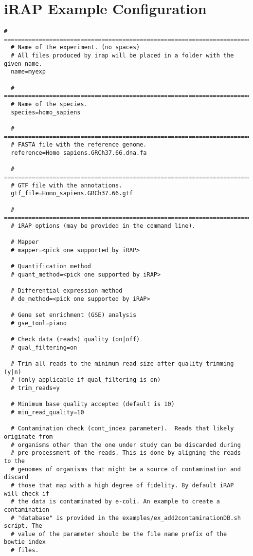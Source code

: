 \chapter{iRAP Example Configuration}

\begin{lstlisting}[numbers=none, breaklines=true]
  # =============================================================================
  # Name of the experiment. (no spaces)
  # All files produced by irap will be placed in a folder with the given name.
  name=myexp

  # =============================================================================
  # Name of the species.
  species=homo_sapiens

  # =============================================================================
  # FASTA file with the reference genome.
  reference=Homo_sapiens.GRCh37.66.dna.fa

  # =============================================================================
  # GTF file with the annotations.
  gtf_file=Homo_sapiens.GRCh37.66.gtf

  # =============================================================================
  # iRAP options (may be provided in the command line).

  # Mapper
  # mapper=<pick one supported by iRAP>

  # Quantification method
  # quant_method=<pick one supported by iRAP>

  # Differential expression method
  # de_method=<pick one supported by iRAP>

  # Gene set enrichment (GSE) analysis
  # gse_tool=piano

  # Check data (reads) quality (on|off)
  # qual_filtering=on

  # Trim all reads to the minimum read size after quality trimming (y|n)
  # (only applicable if qual_filtering is on)
  # trim_reads=y

  # Minimum base quality accepted (default is 10)
  # min_read_quality=10

  # Contamination check (cont_index parameter).  Reads that likely originate from
  # organisms other than the one under study can be discarded during
  # pre-processment of the reads. This is done by aligning the reads to the
  # genomes of organisms that might be a source of contamination and discard
  # those that map with a high degree of fidelity. By default iRAP will check if
  # the data is contaminated by e-coli. An example to create a contamination
  # "database" is provided in the examples/ex_add2contaminationDB.sh script. The
  # value of the parameter should be the file name prefix of the bowtie index
  # files.


\end{lstlisting}
